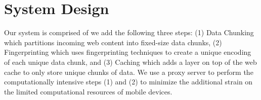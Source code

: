 \section{System Design}
\label{sec:sys_design}
Our system is comprised of we add 
the following three steps: (1) Data Chunking which partitions incoming web content into fixed-size data chunks, (2) Fingerprinting which uses fingerprinting 
techniques to create a unique encoding of each unique data chunk, and (3) Caching which adds a layer on top of the web cache to only store unique chunks of data. 
We use a proxy server to perform the computationally intensive steps (1) and (2) to minimize the additional strain on the limited computational resources of mobile 
devices.





